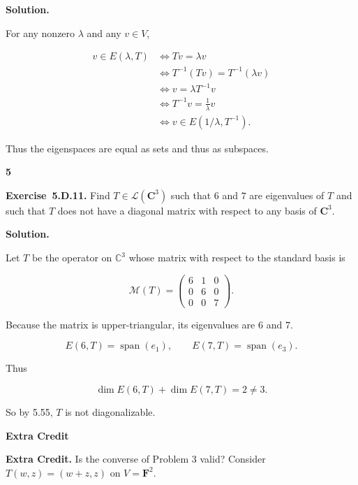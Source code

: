 \documentclass[11pt]{article}
\newcommand{\ProblemDivider}[1]{%
  \vspace{1.0em}
  \noindent\textbf{#1}\par
  \vspace{0.35em}
}
\newcommand{\ProblemAnnounce}{\noindent}
\newcommand{\SolutionAnnounce}{\noindent\textbf{Solution.}\par\medskip}
\newcommand{\Exercise}[1]{\textbf{Exercise~#1.}\;}
\newcommand{\C}{\mathbb{C}}
\DeclareMathOperator{\Span}{span}
\begin{document}
\begin{solutionBox}
\SolutionAnnounce
\doublespacing
For any nonzero \(\lambda\) and any \(v \in V\),

\[
\begin{aligned}
v \in E(\lambda, T)
&\iff Tv = \lambda v \\
&\iff T^{-1}(Tv) = T^{-1}(\lambda v) \\
&\iff v = \lambda T^{-1}v \\
&\iff T^{-1}v = \frac{1}{\lambda} v \\
&\iff v \in E(1/\lambda, T^{-1}).
\end{aligned}
\]

Thus the eigenspaces are equal as sets and thus as subspaces.
\end{solutionBox}

\ProblemDivider{5}

\begin{problemBox}
\ProblemAnnounce
\Exercise{5.D.11}
Find \(T \in \mathcal{L}(\mathbf{C}^3)\) such that \(6\) and \(7\) are eigenvalues of \(T\) and such that \(T\) does not have a diagonal matrix with respect to any basis of \(\mathbf{C}^3\).
\end{problemBox}

\begin{solutionBox}
\SolutionAnnounce
\doublespacing
Let \(T\) be the operator on \(\C^3\) whose matrix with respect to the standard basis is

\[
\mathcal{M}(T) =
\begin{pmatrix}
6 & 1 & 0 \\
0 & 6 & 0 \\
0 & 0 & 7
\end{pmatrix}.
\]

Because the matrix is upper-triangular, its eigenvalues are \(6\) and \(7\).

\[
E(6, T) = \Span(e_1), \qquad
E(7, T) = \Span(e_3).
\]

Thus

\[
\dim E(6,T) + \dim E(7,T) = 2 \neq 3.
\]

So by 5.55, \(T\) is not diagonalizable.
\end{solutionBox}

\ProblemDivider{Extra Credit}

\begin{problemBox}
\ProblemAnnounce
\textbf{Extra Credit.} Is the converse of Problem 3 valid? Consider \(T(w,z)=(w+z,z)\) on \(V=\mathbf{F}^2\).
\end{problemBox}
\end{document}
